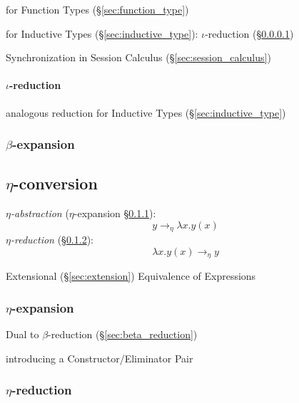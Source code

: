 for Function Types (\S\ref{sec:function_type})

for Inductive Types (\S\ref{sec:inductive_type}): $\iota$-reduction
(\S\ref{sec:iota_reduction})

Synchronization in Session Calculus (\S\ref{sec:session_calculus})
\cite{orchard-yoshida16}



\paragraph{$\iota$-reduction}\label{sec:iota_reduction}\hfill

analogous reduction for Inductive Types (\S\ref{sec:inductive_type})



\subsubsection{$\beta$-expansion}\label{sec:beta_expansion}



\subsection{$\eta$-conversion}\label{sec:eta_conversion}

\emph{$\eta$-abstraction} ($\eta$-expansion \S\ref{sec:eta_expansion}):
\[
  y \rightarrow_\eta \lambda x.y(x)
\]
\emph{$\eta$-reduction} (\S\ref{sec:eta_reduction}):
\[
  \lambda x.y(x) \rightarrow_\eta y
\]

Extensional (\S\ref{sec:extension}) Equivalence of Expressions



\subsubsection{$\eta$-expansion}\label{sec:eta_expansion}

Dual to $\beta$-reduction (\S\ref{sec:beta_reduction})

introducing a Constructor/Eliminator Pair



\subsubsection{$\eta$-reduction}\label{sec:eta_reduction}



